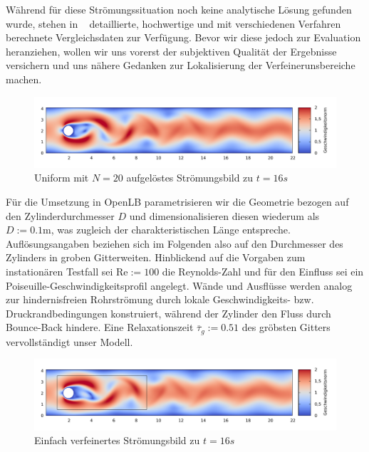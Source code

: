 Während für diese Strömungssituation noch keine analytische Lösung gefunden wurde, stehen in ~\cite{SchaeferTurek96} detaillierte, hochwertige und mit verschiedenen Verfahren berechnete Vergleichsdaten zur Verfügung. Bevor wir diese jedoch zur Evaluation heranziehen, wollen wir uns vorerst der subjektiven Qualität der Ergebnisse versichern und uns nähere Gedanken zur Lokalisierung der Verfeinerunsbereiche machen.

\begin{figure}[H]
\begin{adjustbox}{center}
\includegraphics[width=1.2\textwidth]{img/static/cylinder2d_unrefined_n20_re100_16s.pdf}
\end{adjustbox}
\caption{Uniform mit \(N=20\) aufgelöstes Strömungsbild zu \(t=16s\)}
\label{fig:UniformCylinderVelocity16s}
\end{figure}

Für die Umsetzung in OpenLB parametrisieren wir die Geometrie bezogen auf den Zylinderdurchmesser \(D\) und dimensionalisieren diesen wiederum als \(D := \num{0.1}\si{\meter}\), was zugleich der charakteristischen Länge entspreche. Auflösungsangaben beziehen sich im Folgenden also auf den Durchmesser des Zylinders in groben Gitterweiten. Hinblickend auf die Vorgaben zum instationären Testfall \cite[Kapitel~2.2b]{SchaeferTurek96} sei \(\text{Re}:=100\) die Reynolds-Zahl und für den Einfluss sei ein Poiseuille-Geschwindigkeitsprofil angelegt. Wände und Ausflüsse werden analog zur hindernisfreien Rohrströmung durch lokale Geschwindigkeits- bzw. Druckrandbedingungen konstruiert, während der Zylinder den Fluss durch Bounce-Back hindere. Eine Relaxationszeit \(\overline\tau_g := \num{0.51}\) des gröbsten Gitters vervollständigt unser Modell.

\begin{figure}[h]
\begin{adjustbox}{center}
\includegraphics[width=1.2\textwidth]{img/static/cylinder2d_single_refinement_n20_re100_16s.pdf}
\end{adjustbox}
\caption{Einfach verfeinertes Strömungsbild zu \(t=16s\)}
\label{fig:SingleLevelRefinementCylinderVelocity16s}
\end{figure}


